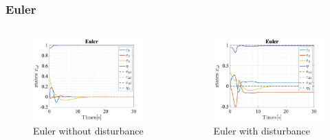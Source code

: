 \documentclass{beamer}
\begin{document}
\begin{frame}
    \frametitle{Euler}

    \begin{columns}

        \begin{figure}[h]
            \centering
            \includegraphics[width=1\textwidth]{Euler_T_Servo.jpg}
            \caption{Euler without disturbance}
        \end{figure}

        \begin{figure}[h]
            \centering
            \includegraphics[width=1\textwidth]{Euler_T_Servo_Dist.jpg}
            \caption{Euler with disturbance}
        \end{figure}
    \end{columns}
\end{frame}
\end{document}
